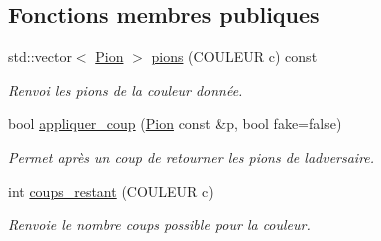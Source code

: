 \subsection*{Fonctions membres publiques}
\begin{DoxyCompactItemize}
\item 
std\+::vector$<$ \hyperlink{structPion}{Pion} $>$ \hyperlink{structEtat_a761f4c386924ab4216613e394184d5df}{pions} (C\+O\+U\+L\+E\+UR c) const \hypertarget{structEtat_a761f4c386924ab4216613e394184d5df}{}\label{structEtat_a761f4c386924ab4216613e394184d5df}

\begin{DoxyCompactList}\small\item\em Renvoi les pions de la couleur donnée. \end{DoxyCompactList}\item 
bool \hyperlink{structEtat_a370b369a8152ebaa56e3ceb05bde698d}{appliquer\+\_\+coup} (\hyperlink{structPion}{Pion} const \&p, bool fake=false)\hypertarget{structEtat_a370b369a8152ebaa56e3ceb05bde698d}{}\label{structEtat_a370b369a8152ebaa56e3ceb05bde698d}

\begin{DoxyCompactList}\small\item\em Permet après un coup de retourner les pions de l\textquotesingle{}adversaire. \end{DoxyCompactList}\item 
int \hyperlink{structEtat_a2fda3d75bfd1ed013b55d3d83409c77c}{coups\+\_\+restant} (C\+O\+U\+L\+E\+UR c)\hypertarget{structEtat_a2fda3d75bfd1ed013b55d3d83409c77c}{}\label{structEtat_a2fda3d75bfd1ed013b55d3d83409c77c}

\begin{DoxyCompactList}\small\item\em Renvoie le nombre coups possible pour la couleur. \end{DoxyCompactList}\end{DoxyCompactItemize}
